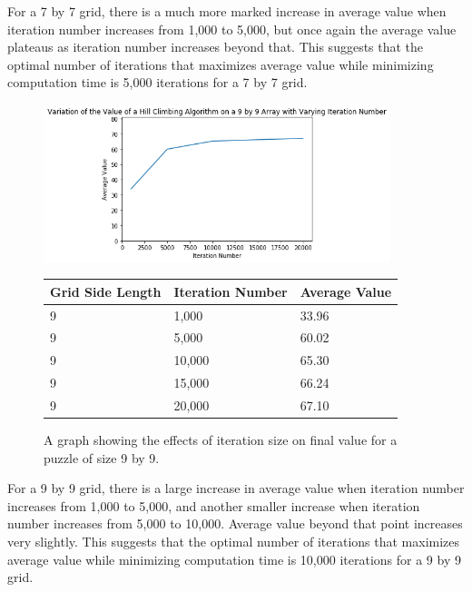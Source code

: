 \documentclass[12pt]{article}
\begin{document}
For a 7 by 7 grid, there is a much more marked increase in average value when iteration number increases from 1,000 to 5,000, but once again the average value plateaus as iteration number increases beyond that. This suggests that the optimal number of iterations that maximizes average value while minimizing computation time is 5,000 iterations for a 7 by 7 grid.

\begin{figure}[H]
    \centering
    \includegraphics[width=0.9\textwidth]{hill_climbing_9x9_iterations}
\begin{tabular}{ |p{4cm}||p{4cm}|p{4cm}|  }
 \hline
Grid Side Length& Iteration Number &Average Value\\
 \hline
9&1,000&33.96\\
9&5,000&60.02\\
9&10,000&65.30\\
9&15,000&66.24\\
9&20,000&67.10\\
 \hline
\end{tabular}
    \caption{A graph showing the effects of iteration size on final value for a puzzle of size 9 by 9.}
    \label{fig:hill_climbing_9x9_iterations}
\end{figure}

For a 9 by 9 grid, there is a large increase in average value when iteration number increases from 1,000 to 5,000, and another smaller increase when iteration number increases from 5,000 to 10,000. Average value beyond that point increases very slightly. This suggests that the optimal number of iterations that maximizes average value while minimizing computation time is 10,000 iterations for a 9 by 9 grid.
\end{document}
